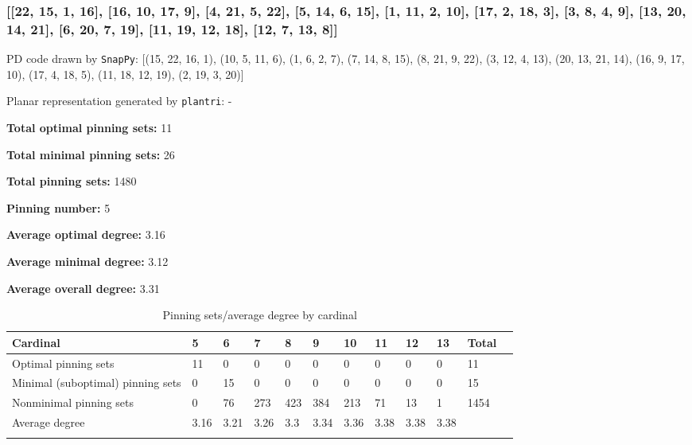 \documentclass{article}%
\begin{document}
\subsubsection{[[22, 15, 1, 16], [16, 10, 17, 9], [4, 21, 5, 22], [5, 14, 6, 15], [1, 11, 2, 10], [17, 2, 18, 3], [3, 8, 4, 9], [13, 20, 14, 21], [6, 20, 7, 19], [11, 19, 12, 18], [12, 7, 13, 8]]}

{\small\noindent PD code drawn by \texttt{SnapPy}: [(15, 22, 16, 1), (10, 5, 11, 6), (1, 6, 2, 7), (7, 14, 8, 15), (8, 21, 9, 22), (3, 12, 4, 13), (20, 13, 21, 14), (16, 9, 17, 10), (17, 4, 18, 5), (11, 18, 12, 19), (2, 19, 3, 20)]}

{\small\noindent Planar representation generated by \texttt{plantri}: -}

\begin{multicols}{2}
{\normalsize \noindent\textbf{Total optimal pinning sets:} 11

\noindent\textbf{Total minimal pinning sets:} 26

\noindent\textbf{Total pinning sets:} 1480

\noindent\textbf{Pinning number:} 5

}
\columnbreak

{\normalsize \noindent\textbf{Average optimal degree:} 3.16

\noindent\textbf{Average minimal degree:} 3.12

\noindent\textbf{Average overall degree:} 3.31

}
\end{multicols}

\begin{table}[ht]
	\caption{Pinning sets/average degree by cardinal}
	\centering
	\renewcommand{\arraystretch}{1.5}
	\begin{tabularx}{\textwidth}{lXXXXXXXXXXX}
		\toprule
			Cardinal & 5 & 6 & 7 & 8 & 9 & 10 & 11 & 12 & 13 & Total\\
			\hline
			Optimal pinning sets & 11 & 0 & 0 & 0 & 0 & 0 & 0 & 0 & 0 & 11 \\
			Minimal (suboptimal) pinning sets & 0 & 15 & 0 & 0 & 0 & 0 & 0 & 0 & 0 & 15 \\
			Nonminimal pinning sets & 0 & 76 & 273 & 423 & 384 & 213 & 71 & 13 & 1 & 1454 \\
			Average degree & 3.16 & 3.21 & 3.26 & 3.3 & 3.34 & 3.36 & 3.38 & 3.38 & 3.38 &  \\
		\bottomrule \\ 
	\end{tabularx}
\end{table}
\end{document}
